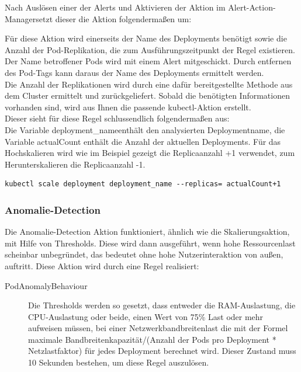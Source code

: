 \documentclass[a4paper,10pt]{scrartcl}
\begin{document}
Nach Auslösen einer der Alerts und Aktivieren der Aktion im \glqq Alert-Action-Manager\grqq setzt dieser die Aktion folgendermaßen um:

Für diese Aktion wird einerseits der Name des Deployments benötigt sowie die Anzahl der Pod-Replikation, die zum Ausführungszeitpunkt der Regel existieren.\\
Der Name betroffener Pods wird mit einem Alert mitgeschickt. Durch entfernen des Pod-Tags kann daraus der Name des Deployments ermittelt werden.\\
Die Anzahl der Replikationen wird durch eine dafür bereitgestellte Methode aus dem Cluster ermittelt und zurückgeliefert.
Sobald die benötigten Informationen vorhanden sind, wird aus Ihnen die passende kubectl-Aktion erstellt.\\
Dieser sieht für diese Regel schlussendlich folgendermaßen aus:\\
Die Variable \glqq deployment\_name\grqq enthält den analysierten Deploymentname, die Variable actualCount enthält die Anzahl der aktuellen Deployments.
Für das Hochskalieren wird wie im Beispiel gezeigt die Replicaanzahl +1 verwendet, zum Herunterskalieren die Replicaanzahl -1.

\begin{lstlisting}
kubectl scale deployment deployment_name --replicas= actualCount+1
\end{lstlisting}

\subsubsection{Anomalie-Detection}

Die Anomalie-Detection Aktion funktioniert, ähnlich wie die Skalierungsaktion, mit Hilfe von Thresholds. Diese wird dann ausgeführt, wenn hohe Ressourcenlast scheinbar unbegründet, das bedeutet ohne hohe Nutzerinteraktion von außen, auftritt.
Diese Aktion wird durch eine Regel realisiert:

\begin{description}
\item[PodAnomalyBehaviour]
Die Thresholds werden so gesetzt, dass entweder die RAM-Auslastung, die CPU-Auslastung oder beide, einen Wert von 75\% Last oder mehr aufweisen müssen, bei einer Netzwerkbandbreitenlast die mit der Formel maximale Bandbreitenkapazität/(Anzahl der Pods pro Deployment * Netzlastfaktor) für jedes Deployment berechnet wird. Dieser Zustand muss 10 Sekunden bestehen, um diese Regel auszulösen.
\end{description}
\end{document}

